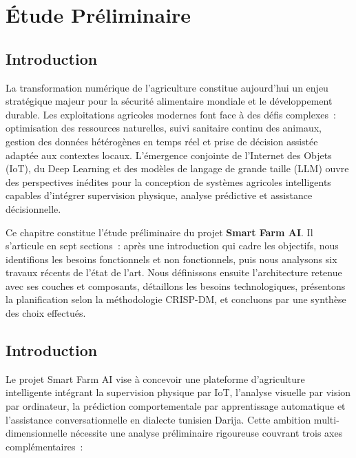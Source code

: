 \chapter{Étude Préliminaire}

\section*{Introduction}
{}

La transformation numérique de l'agriculture constitue aujourd'hui un enjeu stratégique
majeur pour la sécurité alimentaire mondiale et le développement durable. Les exploitations
agricoles modernes font face à des défis complexes~: optimisation des ressources naturelles,
suivi sanitaire continu des animaux, gestion des données hétérogènes en temps réel et
prise de décision assistée adaptée aux contextes locaux.
L'émergence conjointe de l'Internet des Objets (IoT), du Deep Learning et des modèles
de langage de grande taille (LLM) ouvre des perspectives inédites pour la conception
de systèmes agricoles intelligents capables d'intégrer supervision physique, analyse
prédictive et assistance décisionnelle.

Ce chapitre constitue l'étude préliminaire du projet \textbf{Smart Farm AI}.
Il s'articule en sept sections~: après une introduction qui cadre les objectifs,
nous identifions les besoins fonctionnels et non fonctionnels, puis nous analysons
six travaux récents de l'état de l'art. Nous définissons ensuite l'architecture
retenue avec ses couches et composants, détaillons les besoins technologiques,
présentons la planification selon la méthodologie CRISP-DM, et concluons par une
synthèse des choix effectués.

\section{Introduction}

Le projet Smart Farm AI vise à concevoir une plateforme d'agriculture intelligente
intégrant la supervision physique par IoT, l'analyse visuelle par vision par ordinateur,
la prédiction comportementale par apprentissage automatique et l'assistance
conversationnelle en dialecte tunisien Darija.
Cette ambition multi-dimensionnelle nécessite une analyse préliminaire rigoureuse
couvrant trois axes complémentaires~:

